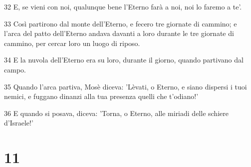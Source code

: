 \par 32 E, se vieni con noi, qualunque bene l'Eterno farà a noi, noi lo faremo a te'.
\par 33 Così partirono dal monte dell'Eterno, e fecero tre giornate di cammino; e l'arca del patto dell'Eterno andava davanti a loro durante le tre giornate di cammino, per cercar loro un luogo di riposo.
\par 34 E la nuvola dell'Eterno era su loro, durante il giorno, quando partivano dal campo.
\par 35 Quando l'arca partiva, Mosè diceva: 'Lèvati, o Eterno, e siano dispersi i tuoi nemici, e fuggano dinanzi alla tua presenza quelli che t'odiano!'
\par 36 E quando si posava, diceva: 'Torna, o Eterno, alle miriadi delle schiere d'Israele!'

\chapter{11}


